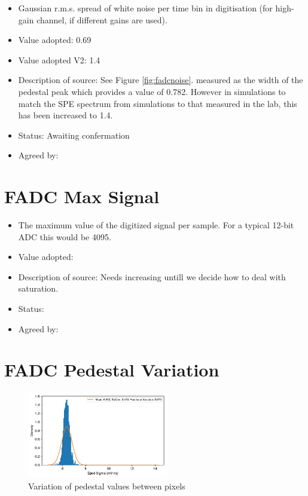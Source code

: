\documentclass[GCT,short]{gct}
\begin{document}
\begin{itemize}
\item Gaussian r.m.s. spread of white noise per time bin in digitisation (for high-gain channel, if different gains are used).
\item Value adopted: 0.69
\item Value adopted V2: 1.4 
\item Description of source: See Figure \ref{fig:fadcnoise}. measured as the width of the pedestal peak which provides a value of 0.782. However in simulations to match the SPE spectrum from simulations to that measured in the lab, this has been increased to 1.4.
\item Status: \color{red}Awaiting confermation\color{black}
\item Agreed by: 
\end{itemize}

\section{FADC Max Signal }
\begin{itemize}
\item The maximum value of the digitized signal per sample. For a typical 12-bit ADC this would be 4095.
\item Value adopted: 
\item Description of source: Needs increasing untill we decide how to deal with saturation.
\item Status: 
\item Agreed by: 
\end{itemize}

\section{FADC Pedestal Variation}

\begin{figure}
\centering
\includegraphics[width=0.55\textwidth]{../40_fadcPedVar/checs_fadc_pedestal_variation_v2.pdf} 
\caption{Variation of pedestal values between pixels}
\label{fig:fadcpedvar}
\end{figure}
\end{document}
